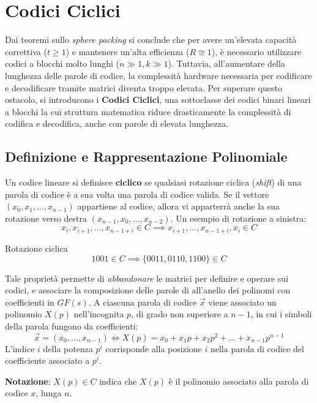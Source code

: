 \section{Codici Ciclici}
Dai teoremi sullo \textit{sphere packing} si conclude che per avere un'elevata capacità correttiva ($t \ge 1$) e mantenere un'alta efficienza ($R \cong 1$), è necessario utilizzare codici a blocchi molto lunghi ($n \gg 1, k \gg 1$).
Tuttavia, all'aumentare della lunghezza delle parole di codice, la complessità hardware necessaria per codificare e decodificare tramite matrici diventa troppo elevata. 
Per superare questo ostacolo, si introducono i \textbf{Codici Ciclici}, una sottoclasse dei codici binari lineari a blocchi la cui struttura matematica riduce drasticamente la complessità di codifica e decodifica, anche con parole di elevata lunghezza.

\subsection{Definizione e Rappresentazione Polinomiale}
Un codice lineare si definisce \textbf{ciclico} se qualsiasi rotazione ciclica (\textit{shift}) di una parola di codice è a sua volta una parola di codice valida. 
Se il vettore $(x_0, x_1, \dots, x_{n-1})$ appartiene al codice, allora vi apparterrà anche la sua rotazione verso destra $(x_{n-1}, x_0, \dots, x_{n-2})$.
Un esempio di rotazione a sinistra:
\[x_i, x_{i+1}, \dots, x_{n-1+i}\in C \implies x_{i+1}, \dots, x_{n-1+i},x_i\in C\]
\begin{esempio}{Rotazione ciclica}
    $$1001 \in C \implies \{0011,0110,1100\} \in C$$
\end{esempio}
Tale proprietà permette di \textit{abbandonare} le matrici per definire e operare sui codici, e associare la composizione delle parole di  all'anello dei polinomi con coefficienti in $GF(s)$. A ciascuna parola di codice $\vec{x}$ viene associato un polinomio $X(p)$ nell'incognita $p$, di grado non superiore a $n-1$, in cui i simboli della parola fungono da coefficienti:
\[ \vec{x} = (x_0, \dots, x_{n-1}) \iff X(p) = x_0 + x_1p + x_2p^2 + \dots + x_{n-1}p^{n-1} \]
L'indice $i$ della potenza $p^i$ corrisponde alla posizione $i$ nella parola di codice del coefficiente associato a $p^i$.

\textbf{Notazione}: $X(p)\in C$ indica che $X(p)$ è il polinomio associato alla parola di codice $x$, lunga $n$.


